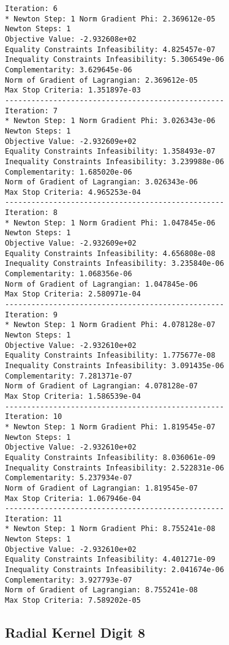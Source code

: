 \documentclass{article}
\begin{document}
\begin{minipage}[t]{0.45\textwidth}
\begin{verbatim}
Iteration: 6
* Newton Step: 1 Norm Gradient Phi: 2.369612e-05
Newton Steps: 1
Objective Value: -2.932608e+02
Equality Constraints Infeasibility: 4.825457e-07
Inequality Constraints Infeasibility: 5.306549e-06
Complementarity: 3.629645e-06
Norm of Gradient of Lagrangian: 2.369612e-05
Max Stop Criteria: 1.351897e-03
--------------------------------------------------
Iteration: 7
* Newton Step: 1 Norm Gradient Phi: 3.026343e-06
Newton Steps: 1
Objective Value: -2.932609e+02
Equality Constraints Infeasibility: 1.358493e-07
Inequality Constraints Infeasibility: 3.239988e-06
Complementarity: 1.685020e-06
Norm of Gradient of Lagrangian: 3.026343e-06
Max Stop Criteria: 4.965253e-04
--------------------------------------------------
Iteration: 8
* Newton Step: 1 Norm Gradient Phi: 1.047845e-06
Newton Steps: 1
Objective Value: -2.932609e+02
Equality Constraints Infeasibility: 4.656808e-08
Inequality Constraints Infeasibility: 3.235840e-06
Complementarity: 1.068356e-06
Norm of Gradient of Lagrangian: 1.047845e-06
Max Stop Criteria: 2.580971e-04
--------------------------------------------------
Iteration: 9
* Newton Step: 1 Norm Gradient Phi: 4.078128e-07
Newton Steps: 1
Objective Value: -2.932610e+02
Equality Constraints Infeasibility: 1.775677e-08
Inequality Constraints Infeasibility: 3.091435e-06
Complementarity: 7.281371e-07
Norm of Gradient of Lagrangian: 4.078128e-07
Max Stop Criteria: 1.586539e-04
--------------------------------------------------
Iteration: 10
* Newton Step: 1 Norm Gradient Phi: 1.819545e-07
Newton Steps: 1
Objective Value: -2.932610e+02
Equality Constraints Infeasibility: 8.036061e-09
Inequality Constraints Infeasibility: 2.522831e-06
Complementarity: 5.237934e-07
Norm of Gradient of Lagrangian: 1.819545e-07
Max Stop Criteria: 1.067946e-04
--------------------------------------------------
Iteration: 11
* Newton Step: 1 Norm Gradient Phi: 8.755241e-08
Newton Steps: 1
Objective Value: -2.932610e+02
Equality Constraints Infeasibility: 4.401271e-09
Inequality Constraints Infeasibility: 2.041674e-06
Complementarity: 3.927793e-07
Norm of Gradient of Lagrangian: 8.755241e-08
Max Stop Criteria: 7.589202e-05
\end{verbatim}
\end{minipage}

\subsection{Radial Kernel Digit 8}\label{radial8}
\end{document}
